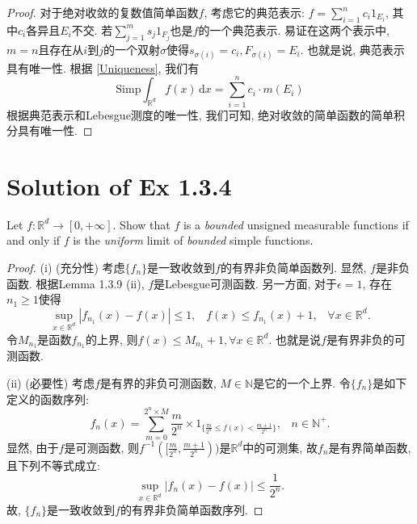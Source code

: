 \documentclass[reqno,a4paper,10pt]{amsart}
\newcommand\dif{\,\mathrm{d}}
\newcommand\Rnum{\mathbb{R}}
\newcommand{\abs}[1]{\left\vert#1\right\vert}
\begin{document}
\begin{proof}
    对于绝对收敛的复数值简单函数$f$, 考虑它的典范表示: $f=\sum_{i=1}^n c_i 1_{E_i}$, 其中$c_i$各异且$E_i$不交. 若$\sum_{j=1}^m s_j 1_{F_j}$也是$f$的一个典范表示. 易证在这两个表示中, $m=n$且存在从$i$到$j$的一个双射$\sigma$使得$s_{\sigma(i)}=c_i, F_{\sigma(i)}=E_i$. 也就是说, 典范表示具有唯一性. 根据 \eqref{Uniqueness}, 我们有
    \begin{equation*}
        \mathrm{Simp}\int_{\mathbb{R}^d}  f(x)\dif x = \sum_{i=1}^n c_i \cdot m(E_i)
    \end{equation*}
    根据典范表示和Lebesgue测度的唯一性, 我们可知, 绝对收敛的简单函数的简单积分具有唯一性. 
\end{proof}



\section{Solution of Ex 1.3.4}\label{1.3.4}
Let $f: \mathbb{R}^d\to [0,+\infty]$. Show that $f$ is a \textit{bounded} unsigned measurable functions if and only if $f$ is the \textit{uniform} limit of \textit{bounded} simple functions.
\begin{proof}
    (i) (充分性) 考虑$\{f_n\}$是一致收敛到$f$的有界非负简单函数列. 显然, $f$是非负函数. 根据Lemma 1.3.9 (ii), $f$是Lebesgue可测函数. 另一方面, 对于$\epsilon=1$, 存在$n_1\geq 1$使得
    \begin{equation*}
        \sup_{x\in\mathbb{R}^d}\abs{f_{n_1}(x)-f(x)}\leq 1,\;\;\; f(x)\leq f_{n_1}(x)+1,\;\;\; \forall x\in\mathbb{R}^d.
    \end{equation*}
    令$M_{n_1}$是函数$f_{n_1}$的上界, 则$f(x)\leq M_{n_1}+1, \forall x\in\mathbb{R}^d$. 也就是说$f$是有界非负的可测函数. 

    (ii) (必要性) 考虑$f$是有界的非负可测函数, $M\in\mathbb{N}$是它的一个上界. 令$\{f_n\}$是如下定义的函数序列: 
    \begin{equation*}
        f_n(x)=\sum_{m=0}^{2^n\times M} \frac{m}{2^n}\times 1_{\{\frac{m}{2^n}\leq f(x)<\frac{m+1}{2^n}\}},\;\;\; n\in\mathbb{N}^+.
    \end{equation*}
    显然, 由于$f$是可测函数, 则$f^{-1}([\frac{m}{2^n},\frac{m+1}{2^n}))$是$\Rnum^d$中的可测集, 故$f_n$是有界简单函数, 且下列不等式成立: 
    \begin{equation*}
        \sup_{x\in\Rnum^d}\abs{f_n(x)-f(x)}\leq \frac{1}{2^n}.
    \end{equation*}
    故, $\{f_n\}$是一致收敛到$f$的有界非负简单函数序列. 
\end{proof}
\end{document}
